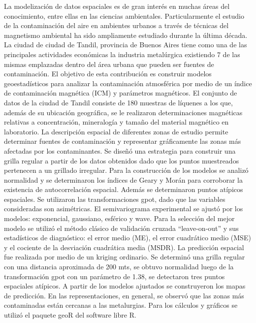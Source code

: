 {La modelización de datos espaciales es de gran interés en muchas áreas del conocimiento, entre ellas en las ciencias ambientales. Particularmente el estudio de la contaminación del aire en ambientes urbanos a través de técnicas del magnetismo ambiental ha sido ampliamente estudiado durante la última década. La ciudad de ciudad de Tandil, provincia de Buenos Aires tiene como una de las principales actividades económicas la industria metalúrgica existiendo 7 de las mismas emplazadas dentro del área urbana que pueden ser fuentes de contaminación. El objetivo de esta contribución es construir modelos geoestadísticos para analizar la contaminación atmosférica por medio de un índice de contaminación magnética (ICM) y parámetros magnéticos. El conjunto de datos de la ciudad de Tandil consiste de 180 muestras de líquenes a los que, además de su ubicación geográfica, se le realizaron determinaciones magnéticas relativas a concentración, mineralogía y tamaño del material magnético en laboratorio. La descripción espacial de diferentes zonas de estudio permite determinar fuentes de contaminación y representar gráficamente las zonas más afectadas por los contaminantes. Se diseñó una estrategia para construir una grilla regular a partir de los datos obtenidos dado que los puntos muestreados pertenecen a un grillado irregular. Para la construcción de los modelos se analizó normalidad y se determinaron los índices de Geary y Morán para corroborar la existencia de autocorrelación espacial. Además se determinaron puntos atípicos espaciales. Se utilizaron las transformaciones gpot, dado que las variables consideradas son asimétricas. El semivariograma experimental se ajustó por los modelos: exponencial, gaussiano, esférico y wave. Para la selección del mejor modelo se utilizó el método clásico de validación cruzada “leave-on-out” y sus estadísticos de diagnóstico: el error medio (ME), el error cuadrático medio (MSE) y el cociente de la desviación cuadrática media (MSDR). La predicción espacial fue realizada por medio de un kriging ordinario. Se determinó una grilla regular con una distancia aproximada de 200 mts, se obtuvo normalidad luego de la transformación gpot con un parámetro de 1.38, se detectaron tres puntos espaciales atípicos. A partir de los modelos ajustados se construyeron los mapas de predicción. En las representaciones, en general, se observó que las zonas más contaminadas están cercanas a las metalurgias. Para los cálculos y gráficos se utilizó el paquete geoR del software libre R. }
